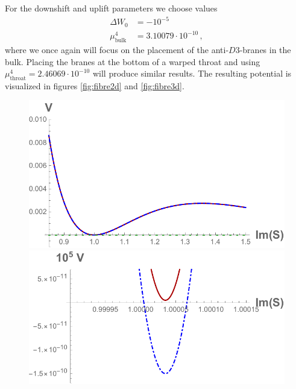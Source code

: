 \documentclass[12pt]{report}
\newcommand{\bea}{\begin{equation}\begin{aligned}}
\newcommand{\eea}{\end{aligned}\end{equation}}
\begin{document}
For the downshift and uplift parameters we choose values
\bea
\Delta W_0 &= - 10^{-5}\\
\mu^4_{\text{bulk}} &= 3.10079 \cdot 10^{-10}\,,
\eea
where we once again will focus on the placement of the anti-$D3$-branes in the bulk. Placing the branes at the bottom of a warped throat and using $\mu^4_{\text{throat}} = 2.46069 \cdot 10^{-10}$ will produce similar results. The resulting potential is visualized in figures \ref{fig:fibre2d} and \ref{fig:fibre3d}. 

\begin{figure}[htb]
\includegraphics[scale=0.55]{fibreSLarge.pdf} \qquad\includegraphics[scale=0.6]{fibreSClose.pdf}

\end{figure}
\end{document}
